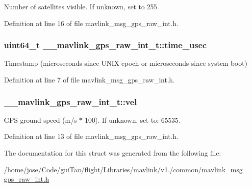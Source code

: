 Number of satellites visible. If unknown, set to 255. 



Definition at line 16 of file mavlink\-\_\-msg\-\_\-gps\-\_\-raw\-\_\-int.\-h.

\hypertarget{struct____mavlink__gps__raw__int__t_a39d30393d02f2b1882040e3fa063f6ea}{
\subsubsection[{time\-\_\-usec}]{\setlength{\rightskip}{0pt plus 5cm}uint64\-\_\-t \-\_\-\-\_\-mavlink\-\_\-gps\-\_\-raw\-\_\-int\-\_\-t\-::time\-\_\-usec}}\label{struct____mavlink__gps__raw__int__t_a39d30393d02f2b1882040e3fa063f6ea}


Timestamp (microseconds since U\-N\-I\-X epoch or microseconds since system boot) 



Definition at line 7 of file mavlink\-\_\-msg\-\_\-gps\-\_\-raw\-\_\-int.\-h.

\hypertarget{struct____mavlink__gps__raw__int__t_a77e8cbdbf554637e4fbbdaaabd562eaf}{
\subsubsection[{vel}]{ \-\_\-\-\_\-mavlink\-\_\-gps\-\_\-raw\-\_\-int\-\_\-t\-::vel}}\label{struct____mavlink__gps__raw__int__t_a77e8cbdbf554637e4fbbdaaabd562eaf}


G\-P\-S ground speed (m/s $\ast$ 100). If unknown, set to\-: 65535. 



Definition at line 13 of file mavlink\-\_\-msg\-\_\-gps\-\_\-raw\-\_\-int.\-h.



The documentation for this struct was generated from the following file\-:\begin{DoxyCompactItemize}
\item 
/home/jose/\-Code/gui\-Tau/flight/\-Libraries/mavlink/v1./common/\hyperlink{mavlink__msg__gps__raw__int_8h}{mavlink\-\_\-msg\-\_\-gps\-\_\-raw\-\_\-int.\-h}\end{DoxyCompactItemize}
